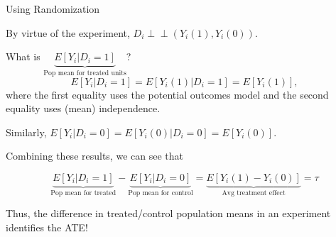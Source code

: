 \documentclass[11pt,english,handout]{beamer}
\newenvironment{wideitemize}{\itemize\addtolength{\itemsep}{10pt}}{\enditemize}
\newcommand{\indep}{\perp\!\!\!\!\perp}
\begin{document}
\begin{frame}{Using Randomization}
\vspace{0.2cm}
\begin{wideitemize}
\item
By virtue of the experiment, $D_i \indep (Y_i(1),Y_i(0))$.

\item
What is $\underbrace{E[Y_i | D_i = 1]}_{\text{Pop mean for treated units}}$?  	
\vspace{.3cm}
\pause
$$	E[Y_i|D_i=1] = E[Y_i(1) | D_i = 1] = E[Y_i(1)],$$
\noindent where the first equality uses the potential outcomes model and the second equality uses (mean) independence.

\pause
\item
Similarly, $E[Y_i | D_i = 0] =  E[Y_i(0) | D_i = 0] = E[Y_i(0)]$.

\pause
\item
Combining these results, we can see that
\vspace{-0.2cm}

$$\underbrace{E[Y_i | D_i = 1]}_{\text{Pop mean for treated}} - \underbrace{E[Y_i | D_i = 0]}_{\text{Pop mean for control}} = \underbrace{E[Y_i(1) - Y_i(0)]}_{\text{Avg treatment effect}} = \tau$$

Thus, the difference in treated/control population means in an experiment identifies the ATE!
\end{wideitemize}
\end{frame}
\end{document}
